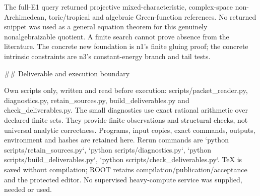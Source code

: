\documentclass[11pt]{article}
\begin{document}
The full-E1 query returned projective mixed-characteristic, complex-space non-Archimedean, toric/tropical and algebraic Green-function references. No returned snippet was used as a general equation theorem for this genuinely nonalgebraizable quotient. A finite search cannot prove absence from the literature. The concrete new foundation is n1's finite gluing proof; the concrete intrinsic constraints are n3's constant-energy branch and tail tests.

\#\# Deliverable and execution boundary

Own scripts only, written and read before execution: scripts/packet\_reader.py, diagnostics.py, retain\_sources.py, build\_deliverables.py and check\_deliverables.py. The small diagnostics use exact rational arithmetic over declared finite sets. They provide finite observations and structural checks, not universal analytic correctness. Programs, input copies, exact commands, outputs, environment and hashes are retained here. Rerun commands are `python scripts/retain\_sources.py`, `python scripts/diagnostics.py`, `python scripts/build\_deliverables.py`, `python scripts/check\_deliverables.py`. TeX is saved without compilation; ROOT retains compilation/publication/acceptance and the protected editor. No supervised heavy-compute service was supplied, needed or used.
\end{document}
